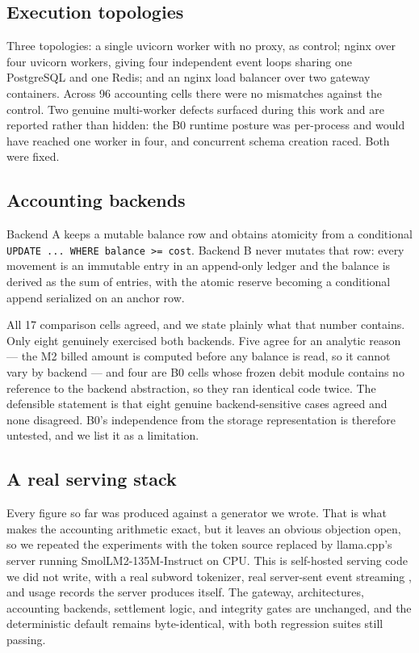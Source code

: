 \documentclass[preprint,3p,authoryear,12pt]{elsarticle}
\begin{document}
\subsection{Execution topologies}
Three topologies: a single uvicorn worker with no proxy, as control; nginx over four
uvicorn workers, giving four independent event loops sharing one PostgreSQL and one
Redis; and an nginx load balancer over two gateway containers. Across 96 accounting
cells there were no mismatches against the control. Two genuine multi-worker defects
surfaced during this work and are reported rather than hidden: the B0 runtime posture was
per-process and would have reached one worker in four, and concurrent schema creation
raced. Both were fixed.

\subsection{Accounting backends}
Backend A keeps a mutable balance row and obtains atomicity from a conditional
\texttt{UPDATE ... WHERE balance >= cost}. Backend B never mutates that row: every
movement is an immutable entry in an append-only ledger and the balance is derived as the
sum of entries, with the atomic reserve becoming a conditional append serialized on an
anchor row.

All 17 comparison cells agreed, and we state plainly what that number contains. Only
eight genuinely exercised both backends. Five agree for an analytic reason --- the M2
billed amount is computed before any balance is read, so it cannot vary by backend ---
and four are B0 cells whose frozen debit module contains no reference to the backend
abstraction, so they ran identical code twice. The defensible statement is that eight
genuine backend-sensitive cases agreed and none disagreed. B0's independence from the
storage representation is therefore untested, and we list it as a limitation.

\subsection{A real serving stack}
\label{sec:realstack}
Every figure so far was produced against a generator we wrote. That is what makes the
accounting arithmetic exact, but it leaves an obvious objection open, so we repeated the
experiments with the token source replaced by llama.cpp's server \citep{llamacpp} running
SmolLM2-135M-Instruct \citep{smollm2} on CPU. This is self-hosted serving code we did not
write, with a real subword tokenizer, real server-sent event streaming \citep{sse}, and
usage records the server produces itself. The gateway, architectures, accounting
backends, settlement logic, and integrity gates are unchanged, and the deterministic
default remains byte-identical, with both regression suites still passing.
\end{document}

